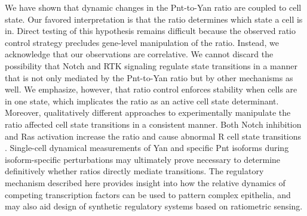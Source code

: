 We have shown that dynamic changes in the Pnt-to-Yan ratio are coupled to cell state. Our favored interpretation is that the ratio determines which state a cell is in. Direct testing of this hypothesis remains difficult because the observed ratio control strategy precludes gene-level manipulation of the ratio. Instead, we acknowledge that our observations are correlative. We cannot discard the possibility that Notch and RTK signaling regulate state transitions in a manner that is not only mediated by the Pnt-to-Yan ratio but by other mechanisms as well. We emphasize, however, that ratio control enforces stability when cells are in one state, which implicates the ratio as an active cell state determinant. Moreover, qualitatively different approaches to experimentally manipulate the ratio affected cell state transitions in a consistent manner. Both Notch inhibition and Ras activation increase the ratio and cause abnormal R cell state transitions \cite{Fortini1992,Yang2006}. Single-cell dynamical measurements of Yan and specific Pnt isoforms during isoform-specific perturbations may ultimately prove necessary to determine definitively whether ratios directly mediate transitions. The regulatory mechanism described here provides insight into how the relative dynamics of competing transcription factors can be used to pattern complex epithelia, and may also aid design of synthetic regulatory systems based on ratiometric sensing.
